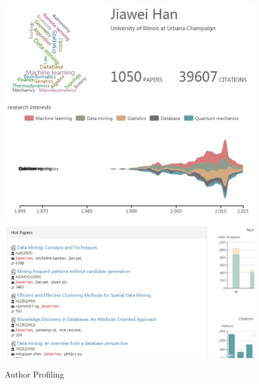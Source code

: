 \begin{figure}
\centering
\includegraphics[width=\columnwidth]{hjwAvatar.pdf}
\includegraphics[width=\columnwidth]{hjwInterest.pdf}
\includegraphics[width=\columnwidth]{hjwPapers.pdf}
\caption{Author Profiling}
\label{fig:hjwProfile}
\vspace{-3ex}
\end{figure}




